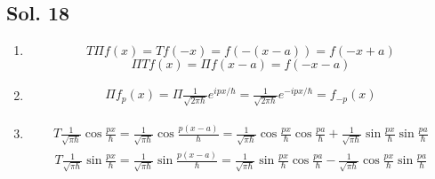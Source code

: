 \subsection*{Sol. 18}
\begin{enumerate}
    \item 
    $$
    T\Pi f(x) = Tf(-x) = f(-(x-a))=f(-x+a)
    $$
    $$
    \Pi T f(x) = \Pi f(x-a) = f(-x-a)
    $$
    \item 
    \begin{align*}
        \Pi f_p(x)=\Pi \frac{1}{\sqrt{2\pi \hbar}}e^{ipx/\hbar}=\frac{1}{\sqrt{2\pi \hbar}}e^{-ipx/\hbar}
        =f_{-p}(x)
    \end{align*}
    \item 
    \begin{align*}
        T\frac{1}{\sqrt{\pi\hbar}}\cos\frac{px}{\hbar}
        =\frac{1}{\sqrt{\pi\hbar}}\cos\frac{p(x-a)}{\hbar}
        =\frac{1}{\sqrt{\pi\hbar}}\cos\frac{px}{\hbar}
        \cos\frac{pa}{\hbar}+
        \frac{1}{\sqrt{\pi\hbar}}\sin\frac{px}{\hbar}
        \sin\frac{pa}{\hbar}
    \end{align*}
     \begin{align*}
        T\frac{1}{\sqrt{\pi\hbar}}\sin\frac{px}{\hbar}
        =\frac{1}{\sqrt{\pi\hbar}}\sin\frac{p(x-a)}{\hbar}
        =\frac{1}{\sqrt{\pi\hbar}}\sin\frac{px}{\hbar}
        \cos\frac{pa}{\hbar}-
        \frac{1}{\sqrt{\pi\hbar}}\cos\frac{px}{\hbar}
        \sin\frac{pa}{\hbar}
    \end{align*}
\end{enumerate}

